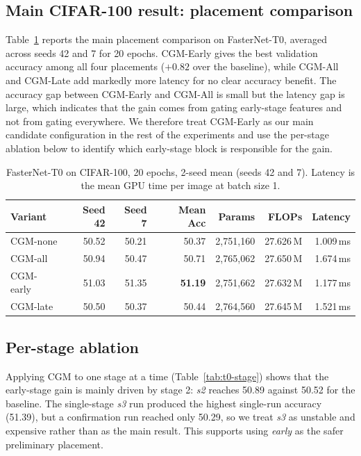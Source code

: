 \documentclass{article}
\begin{document}
\subsection{Main CIFAR-100 result: placement comparison}

Table~\ref{tab:t0-main} reports the main placement comparison on FasterNet-T0, averaged across seeds 42 and 7 for 20 epochs. CGM-Early gives the best validation accuracy among all four placements ($+0.82$ over the baseline), while CGM-All and CGM-Late add markedly more latency for no clear accuracy benefit. The accuracy gap between CGM-Early and CGM-All is small but the latency gap is large, which indicates that the gain comes from gating early-stage features and not from gating everywhere. We therefore treat CGM-Early as our main candidate configuration in the rest of the experiments and use the per-stage ablation below to identify which early-stage block is responsible for the gain.

\begin{table}[t]
\caption{FasterNet-T0 on CIFAR-100, 20 epochs, 2-seed mean (seeds 42 and 7). Latency is the mean GPU time per image at batch size 1.}
\label{tab:t0-main}
\centering
\small
\begin{tabular}{lrrrrrr}
\toprule
Variant & Seed 42 & Seed 7 & Mean Acc & Params & FLOPs & Latency \\
\midrule
CGM-none  & 50.52 & 50.21 & 50.37 & 2{,}751{,}160 & 27.626\,M & 1.009\,ms \\
CGM-all   & 50.94 & 50.47 & 50.71 & 2{,}765{,}062 & 27.650\,M & 1.674\,ms \\
CGM-early & 51.03 & 51.35 & \textbf{51.19} & 2{,}751{,}662 & 27.632\,M & 1.177\,ms \\
CGM-late  & 50.50 & 50.37 & 50.44 & 2{,}764{,}560 & 27.645\,M & 1.521\,ms \\
\bottomrule
\end{tabular}
\end{table}

\subsection{Per-stage ablation}

Applying CGM to one stage at a time (Table~\ref{tab:t0-stage}) shows that the early-stage gain is mainly driven by stage 2: \emph{s2} reaches 50.89 against 50.52 for the baseline. The single-stage \emph{s3} run produced the highest single-run accuracy (51.39), but a confirmation run reached only 50.29, so we treat \emph{s3} as unstable and expensive rather than as the main result. This supports using \emph{early} as the safer preliminary placement.
\end{document}
